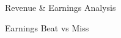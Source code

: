 \documentclass[10pt]{article}
\begin{document}
    \begin{core}{Revenue \& Earnings Analysis}







    \end{core}

    \begin{core}{Earnings Beat vs Miss}



    \end{core}
\end{document}
